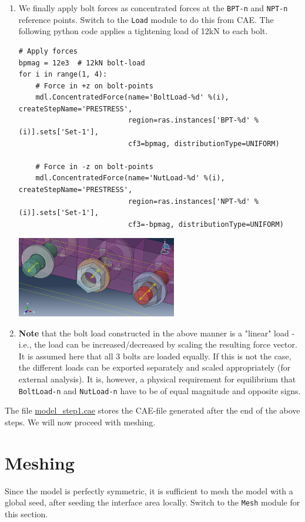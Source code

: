 \documentclass[11pt]{article}
\begin{document}
\begin{enumerate}
\item We finally apply bolt forces as concentrated forces at the \texttt{BPT-n} and \texttt{NPT-n} reference points.
Switch to the \texttt{Load} module to do this from CAE.
The following python code applies a tightening load of 12kN to each bolt.
\begin{verbatim}
# Apply forces
bpmag = 12e3  # 12kN bolt-load
for i in range(1, 4):
    # Force in +z on bolt-points
    mdl.ConcentratedForce(name='BoltLoad-%d' %(i), createStepName='PRESTRESS',
                          region=ras.instances['BPT-%d' %(i)].sets['Set-1'],
                          cf3=bpmag, distributionType=UNIFORM)

    # Force in -z on bolt-points
    mdl.ConcentratedForce(name='NutLoad-%d' %(i), createStepName='PRESTRESS',
                          region=ras.instances['NPT-%d' %(i)].sets['Set-1'],
                          cf3=-bpmag, distributionType=UNIFORM)
\end{verbatim}
\begin{center}
\includegraphics[width=0.55\textwidth]{./figs/loads.png}
\end{center}
\item \textbf{Note} that the bolt load constructed in the above manner is a "linear" load - i.e., the load can be increased/decreased by scaling the resulting force vector.
It is assumed here that all 3 bolts are loaded equally.
If this is not the case, the different loads can be exported separately and scaled appropriately (for external analysis).
It is, however, a physical requirement for equilibrium that \texttt{BoltLoad-n} and \texttt{NutLoad-n} have to be of equal magnitude and opposite signs.
\end{enumerate}

The file \href{https://github.com/Nidish96/Abaqus4Joints/blob/main/assets/assembly/model\_step1.cae}{model\_step1.cae} stores the CAE-file generated after the end of the above steps.
We will now proceed with meshing.
\pagebreak
\section{Meshing}
\label{sec:meshing}
Since the model is perfectly symmetric, it is sufficient to mesh the model with a global seed, after seeding the interface area locally.
Switch to the \texttt{Mesh} module for this section.
\end{document}

